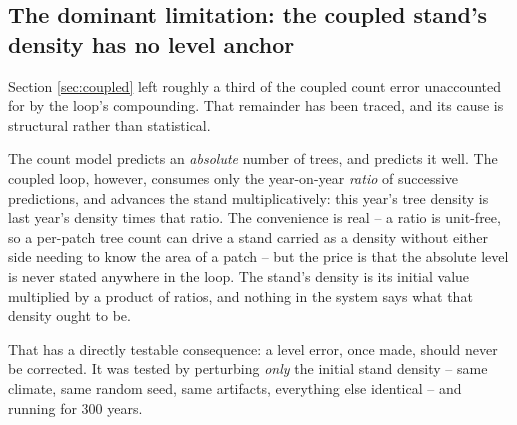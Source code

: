 \documentclass[11pt]{article}
\begin{document}
\subsection{The dominant limitation: the coupled stand's density has no level anchor}
\label{sec:anchor}

Section \ref{sec:coupled} left roughly a third of the coupled count error unaccounted for by the loop's compounding. That remainder has been traced, and its cause is structural rather than statistical.

The count model predicts an \emph{absolute} number of trees, and predicts it well. The coupled loop, however, consumes only the year-on-year \emph{ratio} of successive predictions, and advances the stand multiplicatively: this year's tree density is last year's density times that ratio. The convenience is real -- a ratio is unit-free, so a per-patch tree count can drive a stand carried as a density without either side needing to know the area of a patch -- but the price is that the absolute level is never stated anywhere in the loop. The stand's density is its initial value multiplied by a product of ratios, and nothing in the system says what that density ought to be.

That has a directly testable consequence: a level error, once made, should never be corrected. It was tested by perturbing \emph{only} the initial stand density -- same climate, same random seed, same artifacts, everything else identical -- and running for 300 years.
\end{document}
